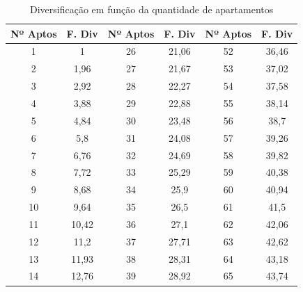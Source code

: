 \documentclass[12pt,openright,oneside,a4paper,brazil]{abntex2}
\begin{document}

\begin{table}[H] %
\centering

        \centering
        \caption{Diversificação em função da quantidade de apartamentos}
        \label{tab:diversificacao_quantidade_apartamentos}
        \vspace{0.15cm} %
        \setlength{\tabcolsep}{8pt} %
        \renewcommand{\arraystretch}{1.2} %
        \begin{tabular}{c | c| c | c |c | c}
            \hline
            \textbf{Nº Aptos} & \textbf{F. Div} & \textbf{Nº Aptos} & \textbf{F. Div} & \textbf{Nº Aptos} & \textbf{F. Div} \rule{0pt}{15pt}\\
            \hline
            1 & 1 & 26 & 21,06 & 52 & 36,46 \\ \hline
            2 & 1,96 & 27 & 21,67 & 53 & 37,02 \\ \hline
            3 & 2,92 & 28 & 22,27 & 54 & 37,58 \\ \hline
            4 & 3,88 & 29 & 22,88 & 55 & 38,14 \\ \hline
            5 & 4,84 & 30 & 23,48 & 56 & 38,7 \\ \hline
            6 & 5,8 & 31 & 24,08 & 57 & 39,26 \\ \hline
            7 & 6,76 & 32 & 24,69 & 58 & 39,82 \\ \hline
            8 & 7,72 & 33 & 25,29 & 59 & 40,38 \\ \hline
            9 & 8,68 & 34 & 25,9 & 60 & 40,94 \\ \hline
            10 & 9,64 & 35 & 26,5 & 61 & 41,5 \\ \hline
            11 & 10,42 & 36 & 27,1 & 62 & 42,06 \\ \hline
            12 & 11,2 & 37 & 27,71 & 63 & 42,62 \\ \hline
            13 & 11,93 & 38 & 28,31 & 64 & 43,18 \\ \hline
            14 & 12,76 & 39 & 28,92 & 65 & 43,74 \\ \hline

\end{tabular}
\end{table}
\end{document}
